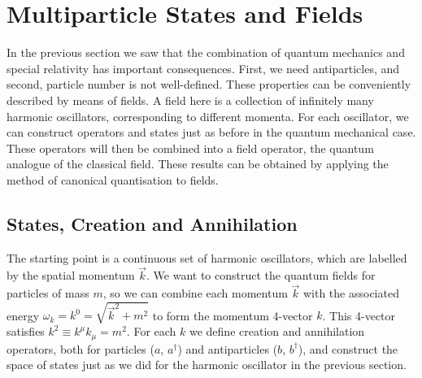 \documentclass[12pt]{report}
\newcommand{\2}{\ensuremath{\sqrt{2}\,}}
\begin{document}
      \section{Multiparticle States and Fields}
      In the previous section we saw that the combination of quantum mechanics and special
      relativity has important consequences. First, we need antiparticles, and second, particle
      number is not well-defined. These properties can be conveniently described by means of 
      fields. A field here is a collection of infinitely many harmonic oscillators, corresponding to
      different momenta. For each oscillator, we can construct operators and states just as before
      in the quantum mechanical case. These operators will then be combined into a field operator,
      the quantum analogue of the classical field. These results can be obtained by applying the
      method of canonical quantisation to fields.
      
      \subsection{States, Creation and Annihilation}
      The starting point is a continuous set of harmonic oscillators, which are
      labelled by the spatial momentum $\vec{k}$. We want to construct the quantum fields for
      particles of mass $m$, so we can combine each momentum $\vec{k}$ with the associated energy
      $\omega_k=k^0=\sqrt{\vec{k}^2 +m^2}$ to form the momentum 4-vector $k$. This 4-vector
      satisfies $k^2\equiv k^\mu k_\mu=m^2$. For each $k$ we define creation and annihilation 
      operators, both for particles ($a$, $a^\dagger$) and
      antiparticles ($b$, $b^\dagger$), and construct the
      space of states just as we did for the harmonic oscillator in the previous section. 
\end{document}
